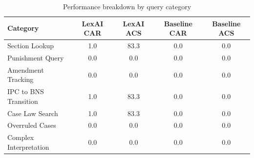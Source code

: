 \begin{table}[ht]
\centering
\caption{Performance breakdown by query category}
\label{tab:category_performance}
\begin{tabular}{lcccc}
\toprule
\textbf{Category} & \textbf{LexAI CAR} & \textbf{LexAI ACS} & \textbf{Baseline CAR} & \textbf{Baseline ACS} \\
\midrule
Section Lookup & 1.0 & 83.3 & 0.0 & 0.0 \\
Punishment Query & 0.0 & 0.0 & 0.0 & 0.0 \\
Amendment Tracking & 0.0 & 0.0 & 0.0 & 0.0 \\
IPC to BNS Transition & 1.0 & 83.3 & 0.0 & 0.0 \\
Case Law Search & 1.0 & 83.3 & 0.0 & 0.0 \\
Overruled Cases & 0.0 & 0.0 & 0.0 & 0.0 \\
Complex Interpretation & 0.0 & 0.0 & 0.0 & 0.0 \\
\bottomrule
\end{tabular}
\end{table}